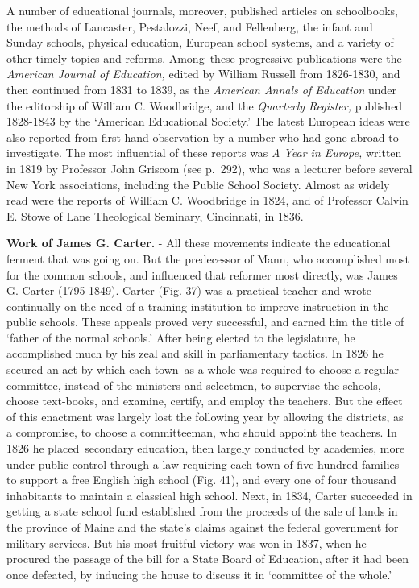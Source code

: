 \documentclass[]{book}
\begin{document}
A number of educational journals, moreover, published articles on schoolbooks, the methods of Lancaster, Pestalozzi, Neef, and Fellenberg, the infant and Sunday schools, physical education, European school systems, and a variety of other timely topics and reforms. Among~these progressive publications were the \emph{American Journal of Education,} edited by William Russell from 1826-1830, and then continued from 1831 to 1839, as the \emph{American Annals of Education} under the editorship of William C. Woodbridge, and the \emph{Quarterly Register,} published 1828-1843 by the `American Educational Society.' The latest European ideas were also reported from first-hand observation by a number who had gone abroad to investigate. The most influential of these reports was \emph{A Year in Europe,} written in 1819 by Professor John Griscom (see p.~292), who was a lecturer before several New York associations, including the Public School Society. Almost as widely read were the reports of William C. Woodbridge in 1824, and of Professor Calvin E. Stowe of Lane Theological Seminary, Cincinnati, in 1836.

\textbf{Work of James G. Carter.} - All these movements indicate the educational ferment that was going on. But the predecessor of Mann, who accomplished most for the common schools, and influenced that reformer most directly, was James G. Carter (1795-1849). Carter (Fig. 37) was a practical teacher and wrote continually on the need of a training institution to improve instruction in the public schools. These appeals proved very successful, and earned him the title of `father of the normal schools.' After being elected to the legislature, he accomplished much by his zeal and skill in parliamentary tactics. In 1826 he secured an act by which each town~as a whole was required to choose a regular committee, instead of the ministers and selectmen, to supervise the schools, choose text-books, and examine, certify, and employ the teachers. But the effect of this enactment was largely lost the following year by allowing the districts, as a compromise, to choose a committeeman, who should appoint the teachers. In 1826 he placed~secondary education, then largely conducted by academies, more under public control through a law requiring each town of five hundred families to support a free English high school (Fig. 41), and every one of four thousand inhabitants to maintain a classical high school. Next, in 1834, Carter succeeded in getting a state school fund established from the proceeds of the sale of lands in the province of Maine and the state's claims against the federal government for military services. But his most fruitful victory was won in 1837, when he procured the passage of the bill for a State Board of Education, after it had been once defeated, by inducing the house to discuss it in `committee of the whole.'
\end{document}
